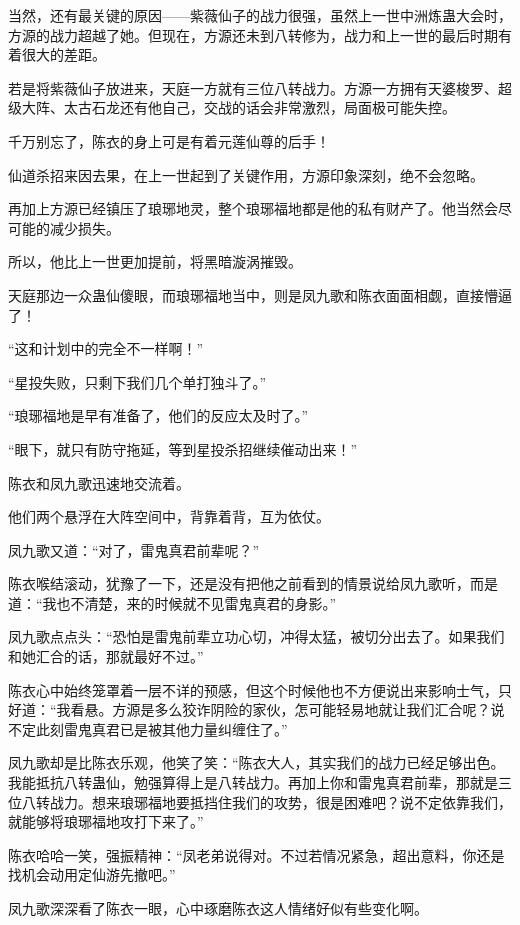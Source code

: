 \begin{this_body}
当然，还有最关键的原因——紫薇仙子的战力很强，虽然上一世中洲炼蛊大会时，方源的战力超越了她。但现在，方源还未到八转修为，战力和上一世的最后时期有着很大的差距。

若是将紫薇仙子放进来，天庭一方就有三位八转战力。方源一方拥有天婆梭罗、超级大阵、太古石龙还有他自己，交战的话会非常激烈，局面极可能失控。

千万别忘了，陈衣的身上可是有着元莲仙尊的后手！

仙道杀招来因去果，在上一世起到了关键作用，方源印象深刻，绝不会忽略。

再加上方源已经镇压了琅琊地灵，整个琅琊福地都是他的私有财产了。他当然会尽可能的减少损失。

所以，他比上一世更加提前，将黑暗漩涡摧毁。

天庭那边一众蛊仙傻眼，而琅琊福地当中，则是凤九歌和陈衣面面相觑，直接懵逼了！

“这和计划中的完全不一样啊！”

“星投失败，只剩下我们几个单打独斗了。”

“琅琊福地是早有准备了，他们的反应太及时了。”

“眼下，就只有防守拖延，等到星投杀招继续催动出来！”

陈衣和凤九歌迅速地交流着。

他们两个悬浮在大阵空间中，背靠着背，互为依仗。

凤九歌又道：“对了，雷鬼真君前辈呢？”

陈衣喉结滚动，犹豫了一下，还是没有把他之前看到的情景说给凤九歌听，而是道：“我也不清楚，来的时候就不见雷鬼真君的身影。”

凤九歌点点头：“恐怕是雷鬼前辈立功心切，冲得太猛，被切分出去了。如果我们和她汇合的话，那就最好不过。”

陈衣心中始终笼罩着一层不详的预感，但这个时候他也不方便说出来影响士气，只好道：“我看悬。方源是多么狡诈阴险的家伙，怎可能轻易地就让我们汇合呢？说不定此刻雷鬼真君已是被其他力量纠缠住了。”

凤九歌却是比陈衣乐观，他笑了笑：“陈衣大人，其实我们的战力已经足够出色。我能抵抗八转蛊仙，勉强算得上是八转战力。再加上你和雷鬼真君前辈，那就是三位八转战力。想来琅琊福地要抵挡住我们的攻势，很是困难吧？说不定依靠我们，就能够将琅琊福地攻打下来了。”

陈衣哈哈一笑，强振精神：“凤老弟说得对。不过若情况紧急，超出意料，你还是找机会动用定仙游先撤吧。”

凤九歌深深看了陈衣一眼，心中琢磨陈衣这人情绪好似有些变化啊。


\end{this_body}
